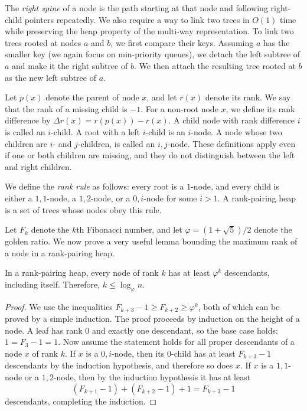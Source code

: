 The \emph{right spine} of a node is the path starting at that node and following right-child pointers repeatedly. We also require a way to link two trees in \(O(1)\) time while preserving the heap property of the multi-way representation. To link two trees rooted at nodes \(a\) and \(b\), we first compare their keys. Assuming \(a\) has the smaller key (we again focus on min-priority queues), we detach the left subtree of \(a\) and make it the right subtree of \(b\). We then attach the resulting tree rooted at \(b\) as the new left subtree of \(a\).

Let \(p(x)\) denote the parent of node \(x\), and let \(r(x)\) denote its rank. We say that the rank of a missing child is \(-1\). For a non-root node \(x\), we define its rank difference by \(\Delta r(x) = r(p(x)) - r(x)\). A child node with rank difference \(i\) is called an \(i\)-child. A root with a left \(i\)-child is an \(i\)-node. A node whose two children are \(i\)- and \(j\)-children, is called an \(i, j\)-node. These definitions apply even if one or both children are missing, and they do not distinguish between the left and right children.

We define the \emph{rank rule} as follows: every root is a \(1\)-node, and every child is either a \(1,1\)-node, a \(1,2\)-node, or a \(0, i\)-node for some \(i > 1\). A rank-pairing heap is a set of trees whose nodes obey this rule.

Let \(F_k\) denote the \(k\)th Fibonacci number, and let \(\varphi = (1 + \sqrt{5})/2\) denote the golden ratio. We now prove a very useful lemma bounding the maximum rank of a node in a rank-pairing heap.

\begin{lemma}
In a rank-pairing heap, every node of rank \(k\) has at least \(\varphi^k\) descendants, including itself. Therefore, \(k \leq \log_\varphi n\).
\end{lemma}

\begin{proof}
We use the inequalities \(F_{k+3} - 1 \geq F_{k+2} \geq \varphi^k\), both of which can be proved by a simple induction. The proof proceeds by induction on the height of a node. A leaf has rank 0 and exactly one descendant, so the base case holds: \(1 = F_{3} - 1 = 1\). Now assume the statement holds for all proper descendants of a node \(x\) of rank \(k\). If \(x\) is a \(0, i\)-node, then its \(0\)-child has at least \(F_{k+3} - 1\) descendants by the induction hypothesis, and therefore so does \(x\). If \(x\) is a \(1,1\)-node or a \(1,2\)-node, then by the induction hypothesis it has at least 
\[
(F_{k+1} - 1) + (F_{k+2} - 1) + 1 = F_{k+3} - 1
\]
descendants, completing the induction.
\end{proof}

